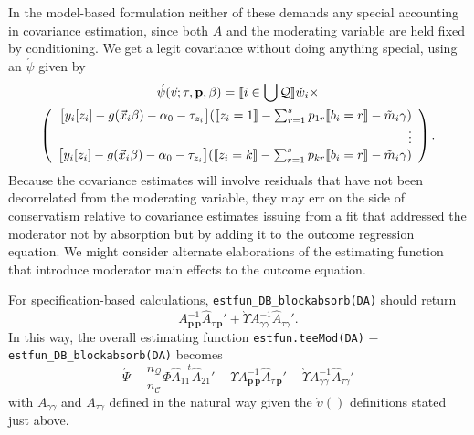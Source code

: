 \documentclass{article}
\DeclarePairedDelimiter{\indicator}{\llbracket}{\rrbracket}
\newcommand{\owt}[1][{[z_{i}]}]{\ensuremath{\check{w}_{i#1}}}
\newcommand{\AbsorbInterceptsEF}{\Upsilon}
\newcommand{\absorbModeratorEF}{\grave{\upsilon}}
\newcommand{\AbsorbModeratorEF}{\grave{\Upsilon}}
\begin{document}
In the model-based formulation neither of these demands any special
accounting in covariance estimation, since both $A$ and the moderating
variable are held fixed by conditioning. We get a legit covariance
without doing anything special, using an $\acute{\psi}$ given by
\begin{multline*}
  \acute{\psi}(\vec{v}; \tau, \mathbf{p}, \beta) =
    \indicator{i \in \bigcup \mathcal{Q}}\owt[] \times \\
\left(
  \begin{array}{r}
    \big[y_{i}[z_{i}]
    -
    g(\vec{x}_{i}\beta)-\alpha_{0}-\tau_{z_{i}}\big]
    (
    \indicator{z_{i}=1}-
    \sum_{r=1}^{s}p_{1r}\indicator{b_{i}=r}
    - \tilde{m}_{i}\gamma)\\
    \vdots \\
    {}\big[y_{i}[z_{i}]
    - g(\vec{x}_{i}\beta) -\alpha_{0} -
    \tau_{z_{i}}\big]
    (
    \indicator{z_{i}=k}
    -
    \sum_{r=1}^{s}p_{kr}\indicator{b_{i}=r}
    -
    \tilde{m}_{i}\gamma)\\
  \end{array}
\right) .
\end{multline*}
Because the covariance estimates will
involve residuals that have not been decorrelated from the moderating
variable, they may err on the side of conservatism relative to
covariance estimates issuing from a fit that addressed the moderator
not by absorption but by adding it to the outcome regression
equation. We might consider alternate elaborations of the estimating
function that introduce moderator main effects to the outcome equation.

For specification-based calculations, \texttt{estfun\_DB\_blockabsorb(DA)}
 should return
 \begin{equation*}
   A_{\mathbf{p}\,\mathbf{p}}^{-1}\hat{A}_{\tau\,\mathbf{p}}' +
  \AbsorbModeratorEF{}A_{\gamma \gamma}^{-1}\hat{A}_{\tau \gamma}'.
 \end{equation*}
 In this way, the overall estimating function
 \texttt{estfun.teeMod(DA)} $-$ \texttt{estfun\_DB\_blockabsorb(DA)}
 becomes
 \begin{equation}
   \label{eq:19}
  \acute{\Psi} -
  \frac{n_{\mathcal{Q}}}{n_{\mathcal{C}}}\Phi
  \hat{A}_{11}^{-t}\hat{A}_{21}' - \AbsorbInterceptsEF{}
  A_{\mathbf{p}\,\mathbf{p}}^{-1}\hat{A}_{\tau\,\mathbf{p}}' -
  \AbsorbModeratorEF{}A_{\gamma \gamma}^{-1}\hat{A}_{\tau \gamma}'
 \end{equation}
with $A_{\gamma \gamma}$ and $A_{\tau \gamma}$ defined in the natural
way given the $\absorbModeratorEF()$ definitions stated just above.
\end{document}
